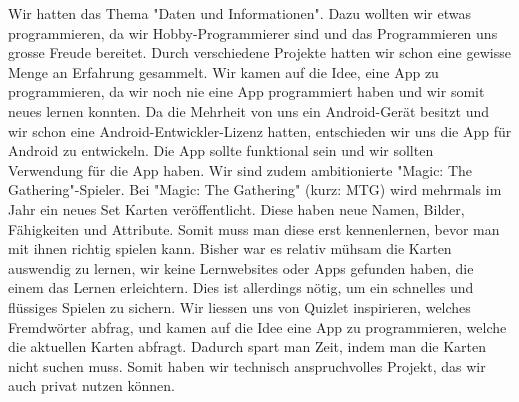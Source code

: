 Wir hatten das Thema "Daten und Informationen". Dazu wollten wir etwas programmieren, da wir Hobby-Programmierer sind und das Programmieren uns grosse Freude bereitet. Durch verschiedene Projekte hatten wir schon eine gewisse Menge an Erfahrung gesammelt. Wir kamen auf die Idee, eine App zu programmieren, da wir noch nie eine App programmiert haben und wir somit neues lernen konnten. Da die Mehrheit von uns ein Android-Ger\"at besitzt und wir schon eine Android-Entwickler-Lizenz hatten, entschieden wir uns die App f\"ur Android zu entwickeln. Die App sollte funktional sein und wir sollten Verwendung f\"ur die App haben. Wir sind zudem ambitionierte "Magic: The Gathering"-Spieler. Bei "Magic: The Gathering" (kurz: MTG) wird mehrmals im Jahr ein neues Set Karten ver\"offentlicht. Diese haben neue Namen, Bilder, Fähigkeiten und Attribute. Somit muss man diese erst kennenlernen, bevor man mit ihnen richtig spielen kann. Bisher war es relativ m\"uhsam die Karten auswendig zu lernen, wir keine Lernwebsites oder Apps gefunden haben, die einem das Lernen erleichtern. Dies ist allerdings n\"otig, um ein schnelles und fl\"ussiges Spielen zu sichern. Wir liessen uns von Quizlet inspirieren, welches Fremdw\"orter abfrag, und kamen auf die Idee eine App zu programmieren, welche die aktuellen Karten abfragt. Dadurch spart man Zeit, indem man die Karten nicht suchen muss. Somit haben wir technisch anspruchvolles Projekt, das wir auch privat nutzen k\"onnen.